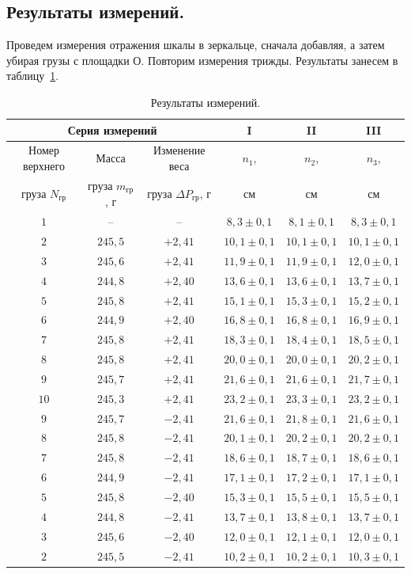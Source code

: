 \documentclass[a4paper,11pt]{article}
\begin{document}
\subsection{Результаты измерений.}
Проведем измерения отражения шкалы в зеркальце, сначала добавляя, а затем убирая грузы с площадки $О$. Повторим измерения трижды. Результаты занесем в таблицу~\ref{table:tab1}.
\begin{table}[h!]
\centering
\begin{tabular}{ ||c|c|c|c|c|c|| }
  \hline
  \multicolumn{3}{||c|}{Серия измерений} & I & II & III \\
  \hline
  Номер верхнего & Масса & Изменение веса & $n_{1}$, & $n_{2}$, & $n_{3}$, \\
  груза $N_{гр}$ & груза $m_{гр}$, $г$ & груза $\Delta P_{гр}$, $г$ & $см$ & $см$ & $см$ \\
  \hline
  $1$ & -- & -- & $8,3 \pm 0,1$ & $8,1 \pm 0,1$ & $8,3 \pm 0,1$ \\
  $2$ & $245,5$ & $+2,41$ & $10,1 \pm 0,1$ & $10,1 \pm 0,1$ & $10,1 \pm 0,1$ \\
  $3$ & $245,6$ & $+2,41$ & $11,9 \pm 0,1$ & $11,9 \pm 0,1$ & $12,0 \pm 0,1$ \\
  $4$ & $244,8$ & $+2,40$ & $13,6 \pm 0,1$ & $13,6 \pm 0,1$ & $13,7 \pm 0,1$ \\
  $5$ & $245,8$ & $+2,41$ & $15,1 \pm 0,1$ & $15,3 \pm 0,1$ & $15,2 \pm 0,1$ \\
  $6$ & $244,9$ & $+2,40$ & $16,8 \pm 0,1$ & $16,8 \pm 0,1$ & $16,9 \pm 0,1$ \\
  $7$ & $245,8$ & $+2,41$ & $18,3 \pm 0,1$ & $18,4 \pm 0,1$ & $18,5 \pm 0,1$ \\
  $8$ & $245,8$ & $+2,41$ & $20,0 \pm 0,1$ & $20,0 \pm 0,1$ & $20,2 \pm 0,1$ \\
  $9$ & $245,7$ & $+2,41$ & $21,6 \pm 0,1$ & $21,6 \pm 0,1$ & $21,7 \pm 0,1$ \\
  $10$ & $245,3$ & $+2,41$ & $23,2 \pm 0,1$ & $23,3 \pm 0,1$ & $23,2 \pm 0,1$ \\
  $9$ & $245,7$ & $-2,41$ & $21,6 \pm 0,1$ & $21,8 \pm 0,1$ & $21,6 \pm 0,1$ \\
  $8$ & $245,8$ & $-2,41$ & $20,1 \pm 0,1$ & $20,2 \pm 0,1$ & $20,2 \pm 0,1$ \\
  $7$ & $245,8$ & $-2,41$ & $18,6 \pm 0,1$ & $18,7 \pm 0,1$ & $18,6 \pm 0,1$ \\
  $6$ & $244,9$ & $-2,41$ & $17,1 \pm 0,1$ & $17,2 \pm 0,1$ & $17,1 \pm 0,1$ \\
  $5$ & $245,8$ & $-2,40$ & $15,3 \pm 0,1$ & $15,5 \pm 0,1$ & $15,5 \pm 0,1$ \\
  $4$ & $244,8$ & $-2,41$ & $13,7 \pm 0,1$ & $13,8 \pm 0,1$ & $13,7 \pm 0,1$ \\
  $3$ & $245,6$ & $-2,40$ & $12,0 \pm 0,1$ & $12,1 \pm 0,1$ & $12,0 \pm 0,1$ \\
  $2$ & $245,5$ & $-2,41$ & $10,2 \pm 0,1$ & $10,2 \pm 0,1$ & $10,3 \pm 0,1$ \\
  \hline
\end{tabular}
\caption{Результаты измерений.}
\label{table:tab1}
\end{table}
\end{document}
